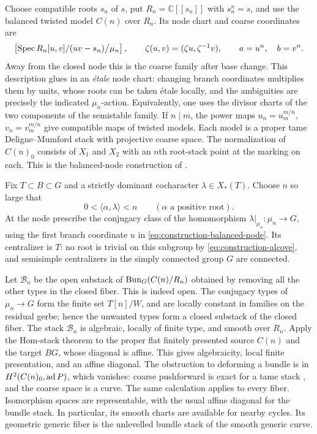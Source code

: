 Choose compatible roots $s_n$ of $s$, put $R_n=\mathbb C[[s_n]]$ with
$s_n^n=s$, and use the balanced twisted model $C(n)$ over $R_n$.
Its node chart and coarse coordinates are
\begin{equation}\label{eq:construction-balanced-node}
 \left[\operatorname{Spec} R_n[u,v]/(uv-s_n)\big/\mu_n\right],
 \qquad \zeta(u,v)=(\zeta u,\zeta^{-1}v),
 \qquad a=u^n,\quad b=v^n.
\end{equation}
Away from the closed node this is the coarse family after base change.
This description glues in an \emph{\'etale} node chart: changing branch
coordinates multiplies them by units, whose roots can be taken
\'etale locally, and the ambiguities are precisely the indicated
$\mu_n$-action.  Equivalently, one uses the divisor charts of the two
components of the semistable family.  If $n\mid m$, the power maps
$u_n=u_m^{m/n}$, $v_n=v_m^{m/n}$ give compatible maps of twisted models.
Each model is a proper tame Deligne--Mumford stack with projective
coarse space.  The normalization of $C(n)_0$ consists of $X_1$ and
$X_2$ with an $n$th root-stack point at the marking on each.  This is
the balanced-node construction of
\cite[Theorems~1.9--1.10, Remark~1.11, and Proposition~2.2(ii)]{OlssonTwisted}.

Fix $T\subset B\subset G$ and a strictly dominant cocharacter
$\lambda\in X_*(T)$.  Choose $n$ so large that
\begin{equation}\label{eq:construction-alcove}
 0<\langle\alpha,\lambda\rangle<n
 \qquad(\alpha\text{ a positive root}).
\end{equation}
At the node prescribe the conjugacy class of the homomorphism
$\lambda|_{\mu_n}:\mu_n\to G$, using the first branch coordinate $u$
in \eqref{eq:construction-balanced-node}.  Its centralizer is $T$:
no root is trivial on this subgroup by
\eqref{eq:construction-alcove}, and semisimple centralizers in the
simply connected group $G$ are connected.

Let $\mathcal B_n$ be the open substack of $\operatorname{Bun}_G(C(n)/R_n)$ obtained
by removing all the other types in the closed fiber.  This is indeed
open.  The conjugacy types of $\mu_n\to G$ form the finite set
$T[n]/W$, and are locally constant in families on the residual gerbe;
hence the unwanted types form a closed substack of the closed fiber.
The stack $\mathcal B_n$ is algebraic, locally of finite type, and
smooth over $R_n$.  Apply the Hom-stack theorem
\cite[Theorem~1.2]{HallRydh} to the proper flat finitely presented source
$C(n)$ and the target $BG$, whose diagonal is affine.  This gives
algebraicity, local finite presentation, and an affine diagonal.
The obstruction to
deforming a bundle is in $H^2(C(n)_0,\operatorname{ad} P)$, which vanishes: coarse
pushforward is exact for a tame stack
\cite[Lemma~2.3.4]{AbramovichVistoli}, and the coarse space is a curve.
The same calculation applies to every fiber.  Isomorphism spaces are
representable, with the usual affine diagonal for the bundle stack.
In particular, its smooth charts are available for nearby cycles.
Its geometric generic fiber is the unlevelled bundle stack of the
smooth generic curve.

